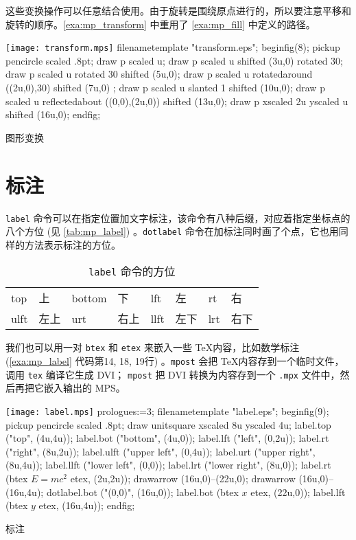 这些变换操作可以任意结合使用。由于旋转是围绕原点进行的，所以要注意平移和旋转的顺序。\autoref{exa:mp_transform} 中重用了 \autoref{exa:mp_fill} 中定义的路径。

\begin{example}[htbp]
\begin{FBTDemo}[numbers=left]{\texttt{[image: transform.mps]}}
filenametemplate "transform.eps";
beginfig(8);
pickup pencircle scaled .8pt;
draw p scaled u;
draw p scaled u shifted (3u,0) rotated 30;
draw p scaled u rotated 30 shifted (5u,0);
draw p scaled u rotatedaround ((2u,0),30) shifted (7u,0) ;
draw p scaled u slanted 1 shifted (10u,0);
draw p scaled u reflectedabout ((0,0),(2u,0)) 
  shifted (13u,0);
draw p xscaled 2u yscaled u shifted (16u,0);
endfig;
\end{FBTDemo}
\vspace{1em}
\caption{\MP 图形变换}
\label{exa:mp_transform}
\end{example}

\section{标注}

 \texttt{label} 命令可以在指定位置加文字标注，该命令有八种后缀，对应着指定坐标点的八个方位 (见 \autoref{tab:mp_label}) 。\texttt{dotlabel} 命令在加标注同时画了个点，它也用同样的方法表示标注的方位。

\begin{table}[htbp]
\centering
\caption{ \texttt{label} 命令的方位}
\label{tab:mp_label}
\begin{tabular}{llllllll}
  \toprule
  top  & 上   & bottom & 下   & lft  & 左   & rt  & 右 \\
  ulft & 左上 & urt    & 右上 & llft & 左下 & lrt & 右下 \\
  \bottomrule
\end{tabular}
\end{table}

我们也可以用一对 \texttt{btex} 和 \texttt{etex} 来嵌入一些 \TeX 内容，比如数学标注 (\autoref{exa:mp_label} 代码第14, 18, 19行) 。\texttt{mpost} 会把 \TeX 内容存到一个临时文件，调用 \texttt{tex} 编译它生成 DVI； \texttt{mpost} 把 DVI 转换为\MP 内容存到一个 \texttt{.mpx} 文件中，然后再把它嵌入输出的 MPS。

\begin{example}[htbp]
\begin{FBTDemo}[numbers=left]{\texttt{[image: label.mps]}}
prologues:=3;
filenametemplate "label.eps";
beginfig(9);
pickup pencircle scaled .8pt;
draw unitsquare xscaled 8u yscaled 4u;
label.top ("top", (4u,4u));
label.bot ("bottom", (4u,0));
label.lft ("left", (0,2u));
label.rt ("right", (8u,2u));
label.ulft ("upper left", (0,4u));
label.urt ("upper right", (8u,4u));
label.llft ("lower left", (0,0));
label.lrt ("lower right", (8u,0));
label.rt (btex $E=mc^2$ etex, (2u,2u));
drawarrow (16u,0)--(22u,0);
drawarrow (16u,0)--(16u,4u);
dotlabel.bot ("(0,0)", (16u,0));
label.bot (btex $x$ etex, (22u,0));
label.lft (btex $y$ etex, (16u,4u));
endfig;
\end{FBTDemo}
\vspace{1em}
\caption{\MP 标注}
\label{exa:mp_label}
\end{example}

